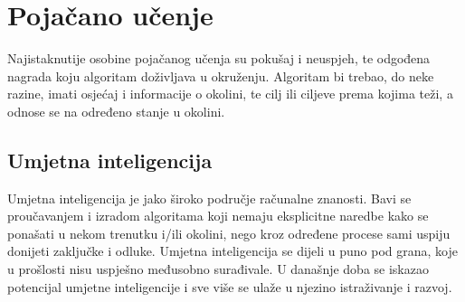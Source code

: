 \section{Pojačano učenje}
Najistaknutije osobine pojačanog učenja su pokušaj i neuspjeh, te odgođena nagrada koju algoritam doživljava u okruženju. Algoritam bi trebao, do neke razine, imati osjećaj i informacije o okolini, te cilj ili ciljeve prema kojima teži, a odnose se na određeno stanje u okolini.

\subsection{Umjetna inteligencija}
Umjetna inteligencija je jako široko područje računalne znanosti. Bavi se proučavanjem i izradom algoritama koji nemaju eksplicitne naredbe kako se ponašati u nekom trenutku i/ili okolini, nego kroz određene procese sami uspiju donijeti zaključke i odluke. Umjetna inteligencija se dijeli u puno pod grana, koje u prošlosti nisu uspješno međusobno surađivale. U današnje doba se iskazao potencijal umjetne inteligencije i sve više se ulaže u njezino istraživanje i razvoj. 

